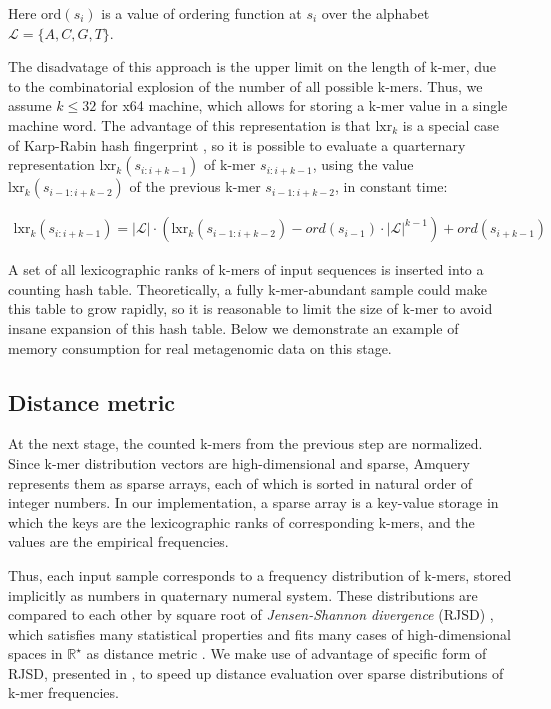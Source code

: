 \documentclass[10pt,letterpaper]{article}
\begin{document}
Here $\mathrm{ord}(s_i)$ is a value of ordering function at $s_i$ over the alphabet ${\mathcal{L}} = \{A, C, G, T \}$. 

The disadvatage of this approach is the upper limit on the length of k-mer, due to the combinatorial explosion of the number of all possible k-mers. Thus, we assume $k \leq 32$ for x64 machine, which allows for storing a k-mer value in a single machine word.
The advantage of this representation is that $\mathrm{lxr}_k$ is a special case of Karp-Rabin hash fingerprint \cite{karp1987efficient}, so it is possible to evaluate a quarternary representation $\mathrm{lxr}_k(s_{i:i+k-1})$ of k-mer $s_{i:i+k-1}$, using the value $\mathrm{lxr}_k(s_{i−1:i+k-2})$ of the previous k-mer $s_{i−1:i+k-2}$, in constant time:

\begin{eqnarray}
\label{eq:schemeP}
    \mathrm{lxr}_k(s_{i:i+k-1}) = |{\mathcal{L}}| \cdot (\mathrm{lxr}_k(s_{i−1:i+k-2}) − ord(s_{i−1}) \cdot 
									 |{\mathcal{L}}|^{k−1}) + ord(s_{i+k−1})
\end{eqnarray}

A set of all lexicographic ranks of k-mers of input sequences is inserted into a counting hash table. Theoretically, a fully k-mer-abundant sample could make this table to grow rapidly, so it is reasonable to limit the size of k-mer to avoid insane expansion of this hash table. Below we demonstrate an example of memory consumption for real metagenomic data on this stage.

\subsection*{Distance metric}
At the next stage, the counted k-mers from the previous step are normalized. Since k-mer distribution vectors are high-dimensional and sparse, Amquery represents them as sparse arrays, each of which is sorted in natural order of integer numbers. 
In our implementation, a sparse array is a key-value storage in which the keys are the lexicographic ranks of corresponding k-mers, and the values are the empirical frequencies.

Thus, each input sample corresponds to a frequency distribution of k-mers, stored implicitly as numbers in quaternary numeral system. These distributions are compared to each other by square root of \textit{Jensen-Shannon divergence} (RJSD) \cite{lin1991divergence}, which satisfies many statistical properties and fits many cases of high-dimensional spaces in $\mathbb{R^\star}$ as distance metric \cite{fuglede2004jensen, endres2003new}. We make use of advantage of specific form of RJSD, presented in \cite{connor2013evaluation}, to speed up distance evaluation over sparse distributions of k-mer frequencies.
\end{document}
